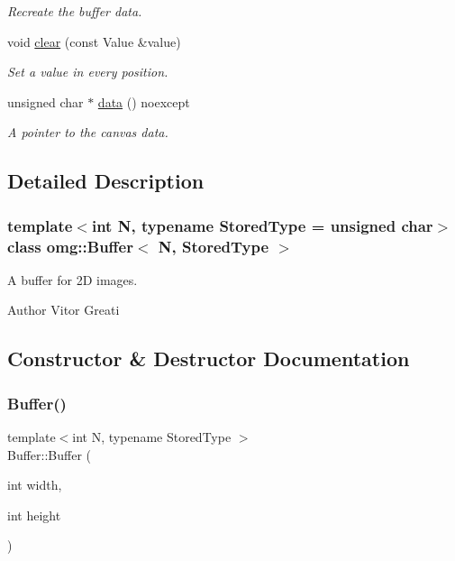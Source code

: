 \begin{DoxyCompactItemize}
\begin{DoxyCompactList}\small\item\em Recreate the buffer data. \end{DoxyCompactList}\item 
void \mbox{\hyperlink{classomg_1_1_buffer_a817affcd52f40b49c3f8e3417747de3d}{clear}} (const Value \&value)
\begin{DoxyCompactList}\small\item\em Set a value in every position. \end{DoxyCompactList}\item 
unsigned char $\ast$ \mbox{\hyperlink{classomg_1_1_buffer_aa2ae2287b9e47f9e3a9f6fb6eb8cfb27}{data}} () noexcept
\begin{DoxyCompactList}\small\item\em A pointer to the canvas data. \end{DoxyCompactList}\end{DoxyCompactItemize}


\subsection{Detailed Description}
\subsubsection*{template$<$int N, typename Stored\+Type = unsigned char$>$\newline
class omg\+::\+Buffer$<$ N, Stored\+Type $>$}

A buffer for 2D images. 

\begin{DoxyAuthor}{Author}
Vitor Greati 
\end{DoxyAuthor}


\subsection{Constructor \& Destructor Documentation}
\mbox{\label{classomg_1_1_buffer_aea5eaa6530d6506d47a4efee72485c42}} 
\subsubsection{\texorpdfstring{Buffer()}{Buffer()}}
{\footnotesize\ttfamily template$<$int N, typename Stored\+Type $>$ \\
Buffer\+::\+Buffer (\begin{DoxyParamCaption}\item[{int}]{width,  }\item[{int}]{height }\end{DoxyParamCaption})}



